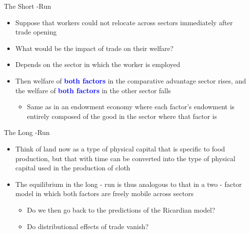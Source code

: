 \documentclass[10pt,hyperref={CJKbookmarks=true},xcolor=dvipsnames,aspectratio=169]{beamer}
\begin{document}
\begin{frame}{The Short -Run }

\begin{itemize}
\item Suppose that workers could not relocate across sectors immediately
after trade opening 
\item What would be the impact of trade on their welfare? 
\item Depends on the sector in which the worker is employed 
\item Then welfare of \textbf{\textcolor{blue}{both factors}} in the comparative
advantage sector rises, and the welfare of \textbf{\textcolor{blue}{both
factors}} in the other sector falls 

\begin{itemize}
\item Same as in an endowment economy where each factor’s endowment is entirely
composed of the good in the sector where that factor is 
\end{itemize}
\end{itemize}
\end{frame}

\begin{frame}{The Long -Run }

\begin{itemize}
\item Think of land now as a type of physical capital that is specific to
food production, but that with time can be converted into the type
of physical capital used in the production of cloth 
\item The equilibrium in the long - run is thus analogous to that in a two
- factor model in which both factors are freely mobile across sectors 

\begin{itemize}
\item Do we then go back to the predictions of the Ricardian model? 
\item Do distributional effects of trade vanish? 
\end{itemize}
\end{itemize}
\end{frame}
\end{document}
